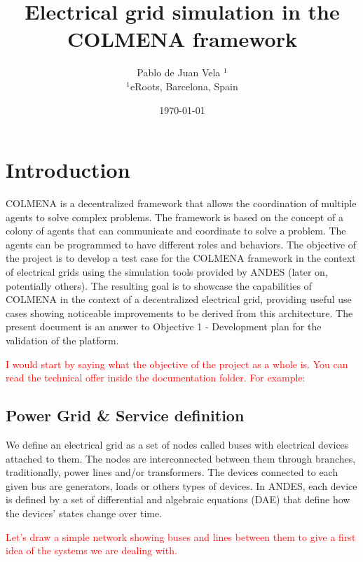 \documentclass{article}
\title{Electrical grid simulation in the COLMENA framework}
\author{Pablo de Juan Vela $^{1}$ \\
        \small $^{1}$eRoots, Barcelona, Spain \\
}
\date{\today}
\begin{document}
\maketitle

\section{Introduction}
COLMENA is a decentralized framework that allows the coordination of multiple agents to solve complex problems. The framework is based on the concept of a colony of agents that can communicate and coordinate to solve a problem. The agents can be programmed to have different roles and behaviors. The objective of the project is to develop a test case for the COLMENA framework in the context of electrical grids using the simulation tools provided by ANDES \cite{grids:models}(later on, potentially others). The resulting goal is to showcase the capabilities of COLMENA in the context of a decentralized electrical grid, providing useful use cases showing noticeable improvements to be derived from this architecture. The present document is an answer to Objective 1 - Development plan for the validation of the platform.

\textcolor{red}{I would start by saying what the objective of the project as a whole is. You can read the technical offer inside the documentation folder. For example:}



\subsection{Power Grid \& Service definition}
We define an electrical grid as a set of nodes called buses with electrical devices attached to them. The nodes are interconnected between them through branches, traditionally, power lines and/or transformers. The devices connected to each given bus are generators, loads or others types of devices. In ANDES, each device is defined by a set of differential and algebraic equations (DAE) that define how the devices' states change over time.

\textcolor{red}{Let's draw a simple network showing buses and lines between them to give a first idea of the systems we are dealing with.}

\end{document}
